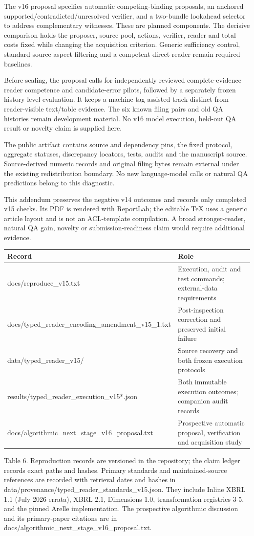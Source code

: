 \documentclass[10pt,a4paper]{article}
\begin{document}
The v16 proposal specifies automatic competing-binding proposals, an anchored supported/contradicted/unresolved verifier, and a two-bundle lookahead selector to address complementary witnesses. These are planned components. The decisive comparison holds the proposer, source pool, actions, verifier, reader and total costs fixed while changing the acquisition criterion. Generic sufficiency control, standard source-aspect filtering and a competent direct reader remain required baselines.

Before scaling, the proposal calls for independently reviewed complete-evidence reader competence and candidate-error pilots, followed by a separately frozen history-level evaluation. It keeps a machine-tag-assisted track distinct from reader-visible text/table evidence. The six known filing pairs and old QA histories remain development material. No v16 model execution, held-out QA result or novelty claim is supplied here.

The public artifact contains source and dependency pins, the fixed protocol, aggregate statuses, discrepancy locators, tests, audits and the manuscript source. Source-derived numeric records and original filing bytes remain external under the existing redistribution boundary. No new language-model calls or natural QA predictions belong to this diagnostic.

This addendum preserves the negative v14 outcomes and records only completed v15 checks. Its PDF is rendered with ReportLab; the editable TeX uses a generic article layout and is not an ACL-template compilation. A broad stronger-reader, natural QA gain, novelty or submission-readiness claim would require additional evidence.

\begin{longtable}{@{}p{}p{}@{}}\toprule
\textbf{Record} & \textbf{Role} \\ \midrule\endhead
docs/reproduce\_v15.txt & Execution, audit and test commands; external-data requirements \\
docs/typed\_reader\_encoding\_amendment\_v15\_1.txt & Post-inspection correction and preserved initial failure \\
data/typed\_reader\_v15/ & Source recovery and both frozen execution protocols \\
results/typed\_reader\_execution\_v15*.json & Both immutable execution outcomes; companion audit records \\
docs/algorithmic\_next\_stage\_v16\_proposal.txt & Prospective automatic proposal, verification and acquisition study \\
\bottomrule\end{longtable}
{\small Table 6. Reproduction records are versioned in the repository; the claim ledger records exact paths and hashes.}
Primary standards and maintained-source references are recorded with retrieval dates and hashes in data/provenance/typed\_reader\_standards\_v15.json. They include Inline XBRL 1.1 (July 2026 errata), XBRL 2.1, Dimensions 1.0, transformation registries 3-5, and the pinned Arelle implementation. The prospective algorithmic discussion and its primary-paper citations are in docs/algorithmic\_next\_stage\_v16\_proposal.txt.
\end{document}
